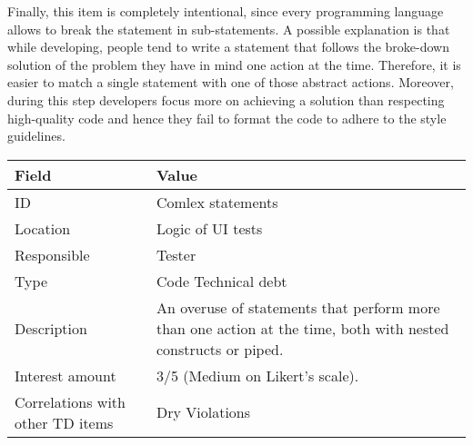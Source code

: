     Finally, this item is completely intentional, since every programming language allows to break the statement in sub-statements. A possible explanation is that while developing, people tend to write a statement that follows the broke-down solution of the problem they have in mind one action at the time. Therefore, it is easier to match a single statement with one of those abstract actions. Moreover, during this step developers focus more on achieving a solution than respecting high-quality code and hence they fail to format the code to adhere to the style guidelines.

	
	
	\begin{table}[!htbp]
		\centering
		\tabulinesep=1.2mm
		\begin{tabu} to \textwidth {|X|X[3]|}
			
			\hline
			\textbf{Field} & \textbf{Value} \\ 
			\hline
			
			ID & Comlex statements \\
			\hline
			
			Location & Logic of UI tests \\
			\hline
			
			Responsible & Tester \\
			\hline
			
			Type & Code Technical debt \\
			\hline	
			
			Description & An overuse of statements that perform more than one action at the time, both with nested constructs or piped. \\
			\hline
			
			
			
			Interest amount &  3/5 (Medium on Likert's scale). \\
			\hline
			
			
			
			Correlations with other TD items & Dry Violations\\
			\hline 	 
			

\end{tabu}
\end{table}
